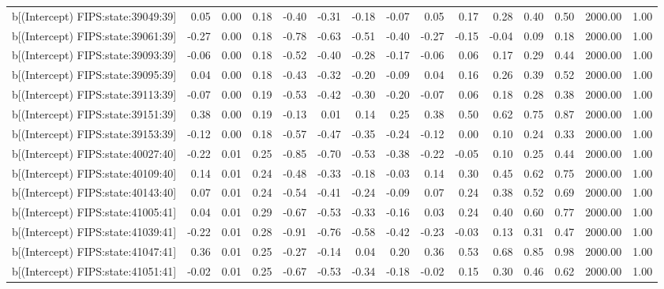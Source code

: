 \begin{table}[ht]
\begin{tabular}{rrrrrrrrrrrrrrr}
  b[(Intercept) FIPS:state:39049:39] & 0.05 & 0.00 & 0.18 & -0.40 & -0.31 & -0.18 & -0.07 & 0.05 & 0.17 & 0.28 & 0.40 & 0.50 & 2000.00 & 1.00 \\ 
  b[(Intercept) FIPS:state:39061:39] & -0.27 & 0.00 & 0.18 & -0.78 & -0.63 & -0.51 & -0.40 & -0.27 & -0.15 & -0.04 & 0.09 & 0.18 & 2000.00 & 1.00 \\ 
  b[(Intercept) FIPS:state:39093:39] & -0.06 & 0.00 & 0.18 & -0.52 & -0.40 & -0.28 & -0.17 & -0.06 & 0.06 & 0.17 & 0.29 & 0.44 & 2000.00 & 1.00 \\ 
  b[(Intercept) FIPS:state:39095:39] & 0.04 & 0.00 & 0.18 & -0.43 & -0.32 & -0.20 & -0.09 & 0.04 & 0.16 & 0.26 & 0.39 & 0.52 & 2000.00 & 1.00 \\ 
  b[(Intercept) FIPS:state:39113:39] & -0.07 & 0.00 & 0.19 & -0.53 & -0.42 & -0.30 & -0.20 & -0.07 & 0.06 & 0.18 & 0.28 & 0.38 & 2000.00 & 1.00 \\ 
  b[(Intercept) FIPS:state:39151:39] & 0.38 & 0.00 & 0.19 & -0.13 & 0.01 & 0.14 & 0.25 & 0.38 & 0.50 & 0.62 & 0.75 & 0.87 & 2000.00 & 1.00 \\ 
  b[(Intercept) FIPS:state:39153:39] & -0.12 & 0.00 & 0.18 & -0.57 & -0.47 & -0.35 & -0.24 & -0.12 & 0.00 & 0.10 & 0.24 & 0.33 & 2000.00 & 1.00 \\ 
  b[(Intercept) FIPS:state:40027:40] & -0.22 & 0.01 & 0.25 & -0.85 & -0.70 & -0.53 & -0.38 & -0.22 & -0.05 & 0.10 & 0.25 & 0.44 & 2000.00 & 1.00 \\ 
  b[(Intercept) FIPS:state:40109:40] & 0.14 & 0.01 & 0.24 & -0.48 & -0.33 & -0.18 & -0.03 & 0.14 & 0.30 & 0.45 & 0.62 & 0.75 & 2000.00 & 1.00 \\ 
  b[(Intercept) FIPS:state:40143:40] & 0.07 & 0.01 & 0.24 & -0.54 & -0.41 & -0.24 & -0.09 & 0.07 & 0.24 & 0.38 & 0.52 & 0.69 & 2000.00 & 1.00 \\ 
  b[(Intercept) FIPS:state:41005:41] & 0.04 & 0.01 & 0.29 & -0.67 & -0.53 & -0.33 & -0.16 & 0.03 & 0.24 & 0.40 & 0.60 & 0.77 & 2000.00 & 1.00 \\ 
  b[(Intercept) FIPS:state:41039:41] & -0.22 & 0.01 & 0.28 & -0.91 & -0.76 & -0.58 & -0.42 & -0.23 & -0.03 & 0.13 & 0.31 & 0.47 & 2000.00 & 1.00 \\ 
  b[(Intercept) FIPS:state:41047:41] & 0.36 & 0.01 & 0.25 & -0.27 & -0.14 & 0.04 & 0.20 & 0.36 & 0.53 & 0.68 & 0.85 & 0.98 & 2000.00 & 1.00 \\ 
  b[(Intercept) FIPS:state:41051:41] & -0.02 & 0.01 & 0.25 & -0.67 & -0.53 & -0.34 & -0.18 & -0.02 & 0.15 & 0.30 & 0.46 & 0.62 & 2000.00 & 1.00 \\ 

\end{tabular}
\end{table}
